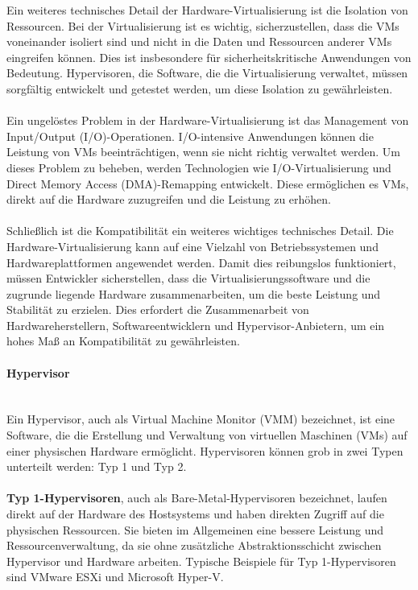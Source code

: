 Ein weiteres technisches Detail der Hardware-Virtualisierung ist die Isolation von Ressourcen. Bei der Virtualisierung ist es wichtig, sicherzustellen, dass die VMs voneinander isoliert sind und nicht in die Daten und Ressourcen anderer VMs eingreifen können. Dies ist insbesondere für sicherheitskritische Anwendungen von Bedeutung. Hypervisoren, die Software, die die Virtualisierung verwaltet, müssen sorgfältig entwickelt und getestet werden, um diese Isolation zu gewährleisten.
\\\\
Ein ungelöstes Problem in der Hardware-Virtualisierung ist das Management von Input/Output (I/O)-Operationen. I/O-intensive Anwendungen können die Leistung von VMs beeinträchtigen, wenn sie nicht richtig verwaltet werden. Um dieses Problem zu beheben, werden Technologien wie I/O-Virtualisierung und Direct Memory Access (DMA)-Remapping entwickelt. Diese ermöglichen es VMs, direkt auf die Hardware zuzugreifen und die Leistung zu erhöhen.
\\\\
Schließlich ist die Kompatibilität ein weiteres wichtiges technisches Detail. Die Hardware-Virtualisierung kann auf eine Vielzahl von Betriebssystemen und Hardwareplattformen angewendet werden. Damit dies reibungslos funktioniert, müssen Entwickler sicherstellen, dass die Virtualisierungssoftware und die zugrunde liegende Hardware zusammenarbeiten, um die beste Leistung und Stabilität zu erzielen. Dies erfordert die Zusammenarbeit von Hardwareherstellern, Softwareentwicklern und Hypervisor-Anbietern, um ein hohes Maß an Kompatibilität zu gewährleisten. 
\paragraph{Hypervisor\\\\}
Ein Hypervisor, auch als Virtual Machine Monitor (VMM) bezeichnet, ist eine Software, die die Erstellung und Verwaltung von virtuellen Maschinen (VMs) auf einer physischen Hardware ermöglicht. Hypervisoren können grob in zwei Typen unterteilt werden: Typ 1 und Typ 2.
\\\\
\textbf{Typ 1-Hypervisoren}, auch als Bare-Metal-Hypervisoren bezeichnet, laufen direkt auf der Hardware des Hostsystems und haben direkten Zugriff auf die physischen Ressourcen. Sie bieten im Allgemeinen eine bessere Leistung und Ressourcenverwaltung, da sie ohne zusätzliche Abstraktionsschicht zwischen Hypervisor und Hardware arbeiten. Typische Beispiele für Typ 1-Hypervisoren sind VMware ESXi und Microsoft Hyper-V.

